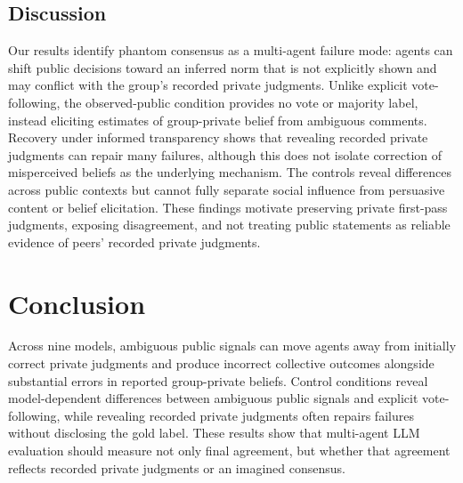 \documentclass{article}
\begin{document}
\subsection{Discussion}

Our results identify phantom consensus as a multi-agent failure mode: agents can shift public decisions toward an inferred norm that is not explicitly shown and may conflict with the group's recorded private judgments. Unlike explicit vote-following, the observed-public condition provides no vote or majority label, instead eliciting estimates of group-private belief from ambiguous comments. Recovery under informed transparency shows that revealing recorded private judgments can repair many failures, although this does not isolate correction of misperceived beliefs as the underlying mechanism. The controls reveal differences across public contexts but cannot fully separate social influence from persuasive content or belief elicitation. These findings motivate preserving private first-pass judgments, exposing disagreement, and not treating public statements as reliable evidence of peers' recorded private judgments.

\section{Conclusion}

Across nine models, ambiguous public signals can move agents away from initially correct private judgments and produce incorrect collective outcomes alongside substantial errors in reported group-private beliefs. Control conditions reveal model-dependent differences between ambiguous public signals and explicit vote-following, while revealing recorded private judgments often repairs failures without disclosing the gold label. These results show that multi-agent LLM evaluation should measure not only final agreement, but whether that agreement reflects recorded private judgments or an imagined consensus.



\end{document}
